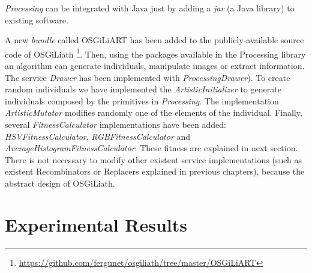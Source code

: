 {\em Processing} %
can be integrated with Java just by adding a {\em jar} (a
Java library) to existing software.

A new {\em bundle} called OSGiLiART has been
added to the publicly-available source code of OSGiLiath \footnote{\url{https://github.com/fergunet/osgiliath/tree/master/OSGiLiART}}.  %
Then, using the packages available in the Processing library an algorithm can generate individuals, manipulate images or extract information. The service {\em Drawer} has been implemented with  {\em ProcessingDrawer}). To create random individuals we have implemented the {\em ArtisticInitializer} to generate individuals composed by the primitives in {\em Processing}. The implementation {\em ArtisticMutator} modifies randomly one of the elements of the individual. Finally, several {\em FitnessCalculator} implementations have been added: {\em HSVFitnessCalculator}, {\em RGBFitnessCalculator} and {\em AverageHistogramFitnessCalculator}. These fitness are explained in next section. There is not necessary to modify other existent service implementations (such as existent Recombinators or Replacers explained in previous chapters), because the abstract design of OSGiLiath.















\section{Experimental Results}
\label{sec:results}


